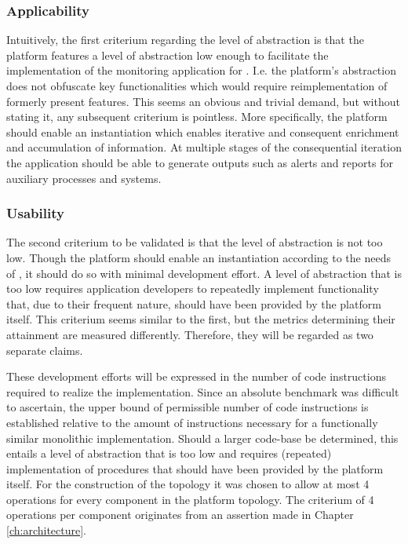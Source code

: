 \subsubsection{Applicability}
Intuitively, the first criterium regarding the level of abstraction is that the platform features a level of abstraction low enough to facilitate the implementation of the monitoring application for \sensitnospace. I.e. the platform's abstraction does not obfuscate key functionalities which would require reimplementation of formerly present features. This seems an obvious and trivial demand, but without stating it, any subsequent criterium is pointless. More specifically, the platform should enable an instantiation which enables iterative and consequent enrichment and accumulation of information. At multiple stages of the consequential iteration the application should be able to generate outputs such as alerts and reports for auxiliary processes and systems.

\subsubsection{Usability}
The second criterium to be validated is that the level of abstraction is not too low. Though the platform should enable an instantiation according to the needs of \idsystems, it should do so with minimal development effort. A level of abstraction that is too low requires application developers to repeatedly implement functionality that, due to their frequent nature, should have been provided by the platform itself. This criterium seems similar to the first, but the metrics determining their attainment are measured differently. Therefore, they will be regarded as two separate claims.

These development efforts will be expressed in the number of code instructions required to realize the implementation. Since an absolute benchmark was difficult to ascertain, the upper bound of permissible number of code instructions is established relative to the amount of instructions necessary for a functionally similar monolithic implementation. Should a larger code-base be determined, this entails a level of abstraction that is too low and requires (repeated) implementation of procedures that should have been provided by the platform itself. For the construction of the topology it was chosen to allow at most 4 operations for every component in the platform topology. The criterium of 4 operations per component originates from an assertion made in Chapter \ref{ch:architecture}.

